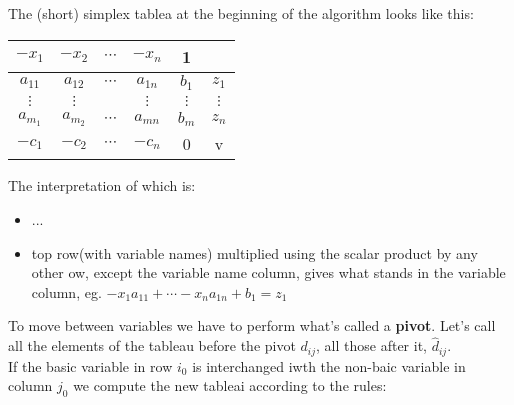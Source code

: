  {
     The (short) simplex tablea at the beginning of the algorithm looks like this:
     \begin{center}
     \begin{tabular}{|cccc|c|c|}

     \hline
     $-x_1$ & $-x_2$ & $\cdots $& $-x_n$ & 1 &  &\\
     \hline
     $a_{11}$ & $a_{12}$ & $\cdots $& $a_{1n}$ &$b_1$ & $z_1$\\
     $\vdots$ &  $\vdots$ & & $\vdots$ &  $\vdots$ &  $\vdots$\\
     $a_{m_1}$ & $a_{m_2}$ & $\cdots $ & $a_{mn}$ &  $b_m$ &  $z_n$\\
     \hline
     $-c_1$ & $-c_2$ & $\cdots $ & $-c_n$ & 0 & v\\
     \hline
     \end{tabular}
     \end{center} 

     The interpretation of which is:
     \begin{itemize}
         \item ...
         \item top row(with variable names) multiplied using the scalar product by any other ow, except the variable name column, gives what stands in the variable column, eg. $-x_1a_{11} + \cdots -x_na_{1n} + b_1 = z_1$
     \end{itemize}

 }\clearpage
 To move between variables we have to perform what's called a \textbf{pivot}.
 Let's call all the elements of the tableau before the pivot $d_{ij}$, all those after it, $\hat{d}_{ij}$.\\
 If the basic variable in row  $i_0$ is interchanged iwth the non-baic variable in column $j_0$ we compute the new tableai according to the rules:

